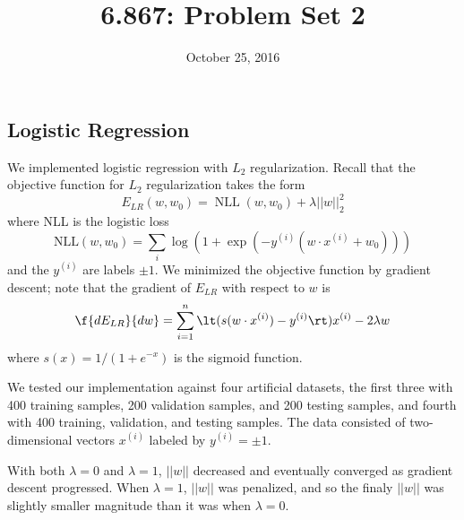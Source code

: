 \documentclass{article}
\title{6.867: Problem Set 2}
\date{October 25, 2016}
\DeclareMathOperator{\NLL}{NLL}
\newcommand{\sind}[1]{^{(#1)}}
\begin{document}
\maketitle

\begin{multicols}{2}


\section{Logistic Regression}
\label{sec:lr}

We implemented logistic regression with $L_2$ regularization.
Recall that the objective function for $L_2$ regularization takes the form
\begin{equation}
    E_{LR}(w, w_0) = \NLL(w, w_0) + \lambda ||w||_2^2
\end{equation}
where NLL is the logistic loss
\begin{equation}
    \text{NLL}(w, w_0) = \sum_i{\log(1+\exp(-y^{(i)}(w\cdot x^{(i)}+w_0)))}
\end{equation}
and the $y\sind{i}$ are labels $\pm 1$.
We minimized the objective function by gradient descent;
note that the gradient of $E_{LR}$ with respect to $w$ is
\begin{equation}
    \f{d E_{LR}}{dw} = \sum_{i=1}^n\lt(s(w\cdot x^{(i)})-y^{(i)}\rt)x^{(i)} - 2\lambda w
\end{equation}
where $s(x) = 1/(1+e^{-x})$ is the sigmoid function.

We tested our implementation against four artificial datasets,
the first three with 400 training samples,
200 validation samples,
and 200 testing samples, and fourth with 400 training, validation, and testing samples.
The data consisted of two-dimensional vectors $x\sind{i}$ labeled by $y\sind{i} = \pm1$.

With both $\lambda=0$ and $\lambda=1$,
$||w||$ decreased and eventually converged
as gradient descent progressed.
When $\lambda = 1$, $||w||$ was penalized,
and so the finaly $||w||$ was slightly smaller magnitude
than it was when $\lambda = 0$.


\end{multicols}
\end{document}

